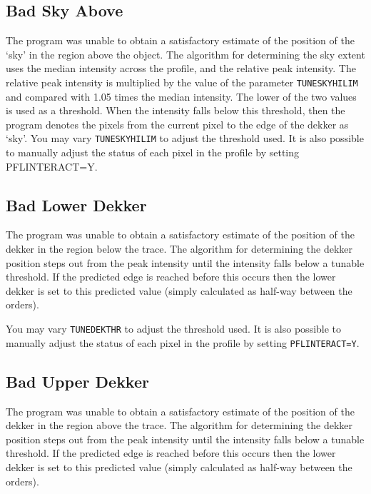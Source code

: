 \documentclass[twoside,11pt]{article}
\newcommand{\xlabel}[1]{}
\renewcommand{\_}{\texttt{\symbol{95}}}
\newcommand{\mlabel}[1]{\xlabel{#1}\label{#1}}
\newcommand{\myindex}[1]{\index{#1}}
\newcommand{\myindex}[1]{}
\begin{document}
\subsection{\mlabel{bad_sky_above} Bad Sky Above}

The program was unable to obtain a satisfactory estimate of the position
of the `sky' in the region above the object. The algorithm for
determining the sky extent uses the median intensity across the profile,
and the relative peak intensity. The relative peak intensity is
multiplied by the value of the parameter \texttt{TUNE\_SKYHILIM} and compared
with 1.05 times the median intensity. The lower of the two values is used as
a threshold. When the intensity falls below this threshold,  then the
program denotes the pixels from the current pixel to the edge of the
dekker as `sky'.  You may vary \texttt{TUNE\_SKYHILIM} to adjust the
threshold used. It is also possible to manually adjust the status of
each pixel in the profile by setting PFL\_INTERACT=Y.

\subsection{\mlabel{bad_lower_dekker} Bad Lower Dekker}
\myindex{Dekker limits!failure}

The program was unable to obtain a satisfactory estimate of the position
of the dekker in the region below the trace. The algorithm for
determining the dekker position steps out from the peak intensity until
the intensity falls below a tunable threshold. If the predicted edge is
reached before this occurs then the lower dekker is set to this
predicted value (simply calculated as half-way between the orders).

You may vary \texttt{TUNE\_DEKTHR} to adjust the threshold used.
It is also possible to manually adjust the status of each pixel in the
profile by setting \texttt{PFL\_INTERACT=Y}\@.

\subsection{\mlabel{bad_upper_dekker} Bad Upper Dekker}

The program was unable to obtain a satisfactory estimate of the position
of the dekker in the region above the trace. The algorithm for
determining the dekker position steps out from the peak intensity until
the intensity falls below a tunable threshold. If the predicted edge is
reached before this occurs then the lower dekker is set to this
predicted value (simply calculated as half-way between the orders).
\end{document}
